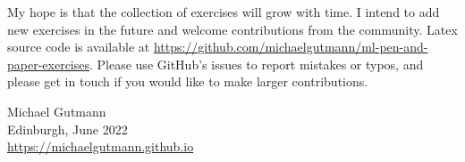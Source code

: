 \hspace{2ex} My hope is that the collection of exercises will grow with time. I
intend to add new exercises in the future and welcome contributions from the
community. Latex source code is available at
\url{https://github.com/michaelgutmann/ml-pen-and-paper-exercises}. Please use
GitHub's issues to report mistakes or typos, and please get in touch if you
would like to make larger contributions.

\begin{flushright}
  Michael Gutmann\\
  Edinburgh, June 2022\\
  \url{https://michaelgutmann.github.io}
\end{flushright}


